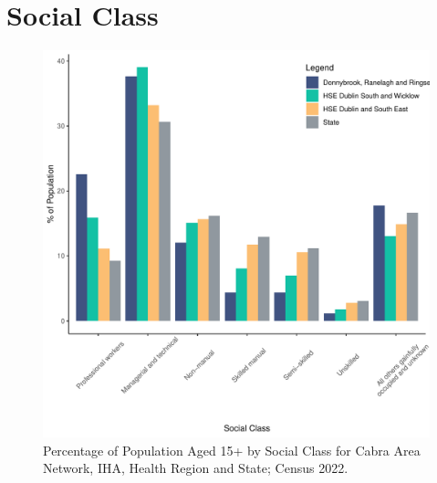 \documentclass{article}
\begin{document}
\section{Social Class}\label{sect:SC}
\begin{figure}[H]
	\centering
	\includegraphics[width = 140mm]{../figures/SocialClassED.pdf}
	\caption{Percentage of Population Aged 15+ by Social Class for Cabra Area Network, IHA, Health Region and State; Census 2022.}
	\label{fig:vbnv}
	\end{figure}
\end{document}
